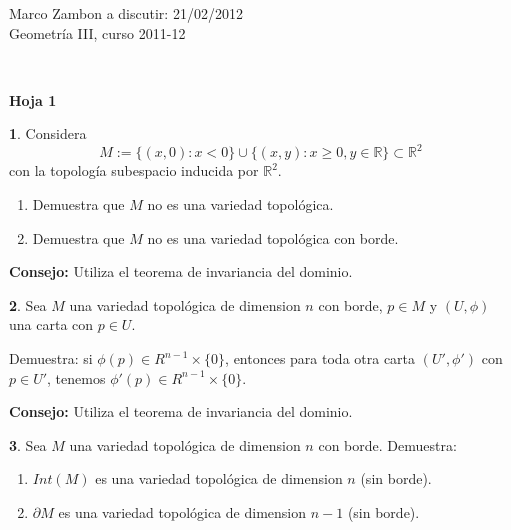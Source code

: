 \documentclass[12pt,a4paper]{report}
\theoremstyle{definition}
\newtheorem{ex}{}
\newcommand{\RR}{\ensuremath{\mathbb R}}
\begin{document}
\noindent
{\sffamily\large Marco Zambon 
\hfill   a discutir:   21/02/2012\\Geometr\'ia III, curso 2011-12}
 

\noindent
\hrulefill{}\\
\begin{center}\bfseries\large\textsf{Hoja 1    \vspace{-2mm}}
\end{center}

\noindent


\begin{ex}  
Considera $$M:=\{(x,0):x <0\}\cup\{(x,y): x\ge0, y \in \RR\}\subset \RR^2$$
con la topolog\'ia subespacio inducida por $\RR^2$.
\begin{enumerate}
\item Demuestra que $M$ no es una variedad topol\'ogica.
\item Demuestra que $M$ no es una variedad topol\'ogica con borde.
\end{enumerate}

\textbf{Consejo:} Utiliza el teorema de invariancia del dominio.
\end{ex}

 \begin{ex}Sea $M$ una variedad topol\'ogica de dimension $n$ con borde, $p\in M$ y $(U,\phi)$ una carta con $p\in U$. 
 
Demuestra: si $\phi(p)\in R^{n-1}\times \{0\}$, entonces para toda otra carta $(U',\phi')$  con $p\in U'$, tenemos $\phi'(p)\in R^{n-1}\times \{0\}$.

 
\textbf{Consejo:} Utiliza el teorema de invariancia del dominio.
\end{ex}


 \begin{ex}Sea $M$ una variedad topol\'ogica de dimension $n$ con borde. Demuestra:
\begin{enumerate}
\item $Int(M)$ es una variedad topol\'ogica de dimension $n$ (sin borde).
\item $\partial M$ es una variedad topol\'ogica de dimension $n-1$ (sin borde).
\end{enumerate}
\end{ex}
 
\end{document}
